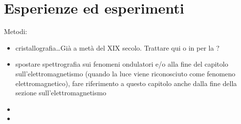 \documentclass[letterpaper,10pt,italian]{jupyterBook}
\begin{document}
\chapter{Esperienze ed esperimenti}
\label{\detokenize{ch/modern/intro-experiments:esperienze-ed-esperimenti}}\label{\detokenize{ch/modern/intro-experiments:physics-hs-modern-intro-experiences}}\label{\detokenize{ch/modern/intro-experiments::doc}}
\sphinxAtStartPar
Metodi:
\begin{itemize}
\item {} 
\sphinxAtStartPar
cristallografia…Già a metà del XIX secolo. Trattare qui o in {\hyperref[\detokenize{ch/waves/intro:physics-hs-waves-optics}]{}} per la {\hyperref[\detokenize{ch/waves/intro:physics-hs-waves-effects-diffraction}]{}}?

\item {} 
\sphinxAtStartPar
spostare spettrografia sui fenomeni ondulatori e/o alla fine del capitolo sull’elettromagnetismo (quando la luce viene riconosciuto come fenomeno elettromagnetico), fare riferimento a questo capitolo anche dalla fine della sezione sull’elettromagnetismo

\item {} 
\sphinxAtStartPar
{} 

\item {} 
\sphinxAtStartPar
{} 

\end{itemize}
\end{document}
